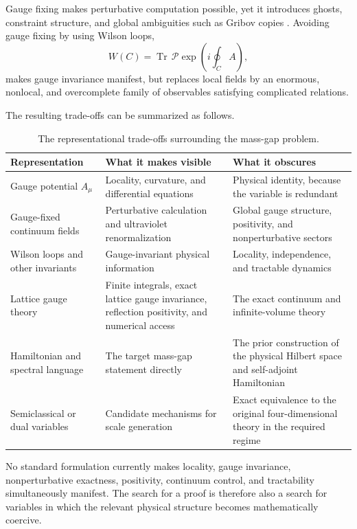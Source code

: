 \documentclass[11pt]{article}
\newcommand{\Tr}{\operatorname{Tr}}
\begin{document}
Gauge fixing makes perturbative computation possible, yet it introduces
ghosts, constraint structure, and global ambiguities such as Gribov copies
\cite{gribov}.  Avoiding gauge fixing by using Wilson loops,
\begin{equation}
  W(C)=\Tr\,\mathcal{P}
  \exp\!\left(i\oint_C A\right),
\end{equation}
makes gauge invariance manifest, but replaces local fields by an enormous,
nonlocal, and overcomplete family of observables satisfying complicated
relations.

The resulting trade-offs can be summarized as follows.

\begin{table}[ht]
\centering
\small
\renewcommand{\arraystretch}{1.2}
\begin{tabularx}{\textwidth}{>{\raggedright\arraybackslash}p{}XX}
\toprule
\textbf{Representation} & \textbf{What it makes visible} & \textbf{What it obscures} \\
\midrule
Gauge potential $A_\mu$
  & Locality, curvature, and differential equations
  & Physical identity, because the variable is redundant \\
Gauge-fixed continuum fields
  & Perturbative calculation and ultraviolet renormalization
  & Global gauge structure, positivity, and nonperturbative sectors \\
Wilson loops and other invariants
  & Gauge-invariant physical information
  & Locality, independence, and tractable dynamics \\
Lattice gauge theory
  & Finite integrals, exact lattice gauge invariance, reflection positivity, and numerical access
  & The exact continuum and infinite-volume theory \\
Hamiltonian and spectral language
  & The target mass-gap statement directly
  & The prior construction of the physical Hilbert space and self-adjoint Hamiltonian \\
Semiclassical or dual variables
  & Candidate mechanisms for scale generation
  & Exact equivalence to the original four-dimensional theory in the required regime \\
\bottomrule
\end{tabularx}
\caption{The representational trade-offs surrounding the mass-gap problem.}
\label{tab:representations}
\end{table}

No standard formulation currently makes locality, gauge invariance,
nonperturbative exactness, positivity, continuum control, and tractability
simultaneously manifest.  The search for a proof is therefore also a search for
variables in which the relevant physical structure becomes mathematically
coercive.
\end{document}
